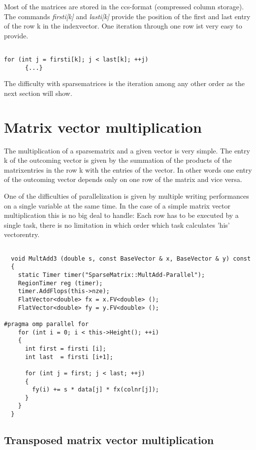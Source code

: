 \documentclass[a4paper,11pt]{scrartcl}
\begin{document}
Most of the matrices are stored in the ccs-format (compressed column storage).
 The commands {\em firsti[k]} and {\em lasti[k]} provide the position of the
 first and last entry of the row k in the indexvector. One
 iteration through one row ist very easy to provide.

\begin{lstlisting}

for (int j = firsti[k]; j < last[k]; ++j)
      {...}

\end{lstlisting}

The difficulty with sparsematrices is the iteration among any other order as 
the next section will show.

\section{Matrix vector multiplication}

The multiplication of a sparsematrix and a given vector is very simple. 
The entry k of the outcoming vector is given by the summation of the products 
of the matrixentries in the row k with the entries of the vector. In other 
words one entry of the outcoming vector depends only on one row of the matrix 
and vice versa.

One of the difficulties of parallelization is given by multiple writing 
performances on a single variable at the same time. In the case of a simple
 matrix vector multiplication this is no big deal to handle: Each row has to be
executed by a single task, there is no limitation in which order which task
 calculates 'his' vectorentry.

\begin{lstlisting}

  void MultAdd3 (double s, const BaseVector & x, BaseVector & y) const
  {
    static Timer timer("SparseMatrix::MultAdd-Parallel");
    RegionTimer reg (timer);
    timer.AddFlops(this->nze);
    FlatVector<double> fx = x.FV<double> ();
    FlatVector<double> fy = y.FV<double> ();

#pragma omp parallel for
    for (int i = 0; i < this->Height(); ++i)
    {
      int first = firsti [i];
      int last  = firsti [i+1];

      for (int j = first; j < last; ++j)
      {
        fy(i) += s * data[j] * fx(colnr[j]);
      }
    }
  }

\end{lstlisting}

\subsection{Transposed matrix vector multiplication}
\end{document}

